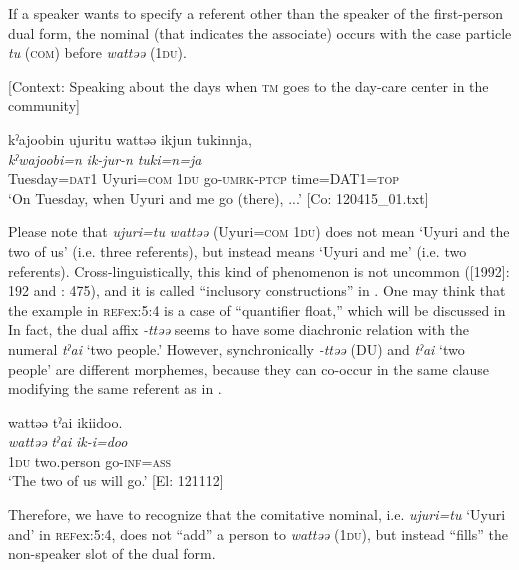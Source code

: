 If a speaker wants to specify a referent other than the speaker of the first-person dual form, the nominal (that indicates the associate) occurs with the case particle \textit{tu} (\textsc{com}) before \textit{wattəə} (1\textsc{du}).

\ea \label{ex:5:4}   [Context: Speaking about the days when \textsc{tm} goes to the day-care center in the community]

\glll  kˀajoobin  ujuritu  wattəə  ikjun  tukinnja,\\
\textit{kˀwajoobi}\footnotemark\textit{=n}  \textit{}  \textit{}  \textit{ik-jur-n}  \textit{tuki=n=ja}\\
Tuesday=\textsc{dat}1  Uyuri=\textsc{com}  1\textsc{du}  go-\textsc{umrk}-\textsc{ptcp}  time=DAT1=\textsc{top}\\
\glt ‘On Tuesday, when Uyuri and me go (there), ...’ [Co: 120415\_01.txt]
\z
{}

Please note that \textit{ujuri=tu} \textit{wattəə} (Uyuri=\textsc{com} 1\textsc{du}) does not mean ‘Uyuri and the two of us’ (i.e. three referents), but instead means ‘Uyuri and me’ (i.e. two referents). Cross-linguistically, this kind of phenomenon is not uncommon (\citealt{Jespersen1924}[1992]: 192 and \citealt{Moravcsik2003}: 475), and it is called “inclusory constructions” in \citet{Lichtenberk2000}. One may think that the example in \textsc{ref}{ex:5:4} is a case of “quantifier float,” which will be discussed in  In fact, the dual affix \textit{{}-ttəə} seems to have some diachronic relation with the numeral \textit{tˀai} ‘two people.’ However, synchronically \textit{{}-ttəə} (DU) and \textit{tˀai} ‘two people’ are different morphemes, because they can co-occur in the same clause modifying the same referent as in .

\ea \label{ex:5:5}   %
\glll  wattəə  tˀai  ikiidoo.\\
\textit{wattəə}  \textit{tˀai}  \textit{ik-i=doo}\\
1\textsc{du}  two.person  go-\textsc{inf}=\textsc{ass}\\
\glt ‘The two of us will go.’ [El: 121112]
\z

Therefore, we have to recognize that the comitative nominal, i.e. \textit{ujuri=tu} ‘Uyuri and’ in \textsc{ref}{ex:5:4}, does not “add” a person to \textit{wattəə} (1\textsc{du}), but instead “fills” the non-speaker slot of the dual form.

